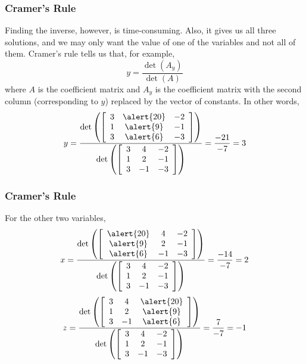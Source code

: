 \documentclass[xcolor=dvipsnames]{beamer}
\begin{document}
\begin{frame}
  \frametitle{Cramer's Rule}
  Finding the inverse, however, is time-consuming. Also, it gives us
  all three solutions, and we may only want the value of one of the
  variables and not all of them. Cramer's rule tells us that, for
  example,
  \begin{equation}
    \label{eq:aquohkol}
    y=\frac{\det(A_{y})}{\det(A)}
  \end{equation}
  where $A$ is the coefficient matrix and $A_{y}$ is the coefficient
  matrix with the second column (corresponding to $y$) replaced by the
  vector of constants. In other words,
\begin{equation}
  \label{eq:veefoubu}
  y=\frac{\det\left(\left[
        \begin{array}{ccc}
          3 & \alert{20} & -2 \\
          1 & \alert{9} & -1 \\
          3 & \alert{6} & -3
        \end{array}
\right]\right)}{\det\left(\left[
      \begin{array}{ccc}
        3 & 4 & -2 \\
        1 & 2 & -1 \\
        3 & -1 & -3
      \end{array}\right]\right)}=\frac{-21}{-7}=3
\end{equation}
\end{frame}

\begin{frame}
  \frametitle{Cramer's Rule}
  For the other two variables,
  \begin{equation}
    \label{eq:sheethei}
    x=\frac{\det\left(\left[
        \begin{array}{ccc}
        \alert{20} & 4 & -2 \\
        \alert{9} & 2 & -1 \\
        \alert{6} & -1 & -3
        \end{array}
\right]\right)}{\det\left(\left[
      \begin{array}{ccc}
        3 & 4 & -2 \\
        1 & 2 & -1 \\
        3 & -1 & -3
      \end{array}\right]\right)}=\frac{-14}{-7}=2
  \end{equation}
  \begin{equation}
    \label{eq:ijohmahv}
    z=\frac{\det\left(\left[
        \begin{array}{ccc}
        3 & 4 & \alert{20} \\
        1 & 2 & \alert{9} \\
        3 & -1 & \alert{6}
        \end{array}
\right]\right)}{\det\left(\left[
      \begin{array}{ccc}
        3 & 4 & -2 \\
        1 & 2 & -1 \\
        3 & -1 & -3
      \end{array}\right]\right)}=\frac{7}{-7}=-1
  \end{equation}
\end{frame}
\end{document}
